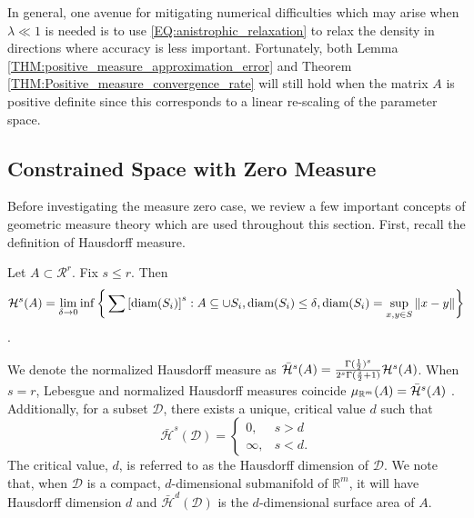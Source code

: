 \documentclass[10pt,fleqn]{article} \pdfoutput=1
\DeclareMathOperator{\1}{\mathbbm{1}} \DeclareMathOperator{\bigO}{\mc O}
\begin{document}
In general, one avenue for mitigating numerical difficulties which may
arise when $\lambda \ll 1$ is needed is to use 
\eqref{EQ:anistrophic_relaxation} to relax the density in directions where
accuracy is less important.  Fortunately, both Lemma
\ref{THM:positive_measure_approximation_error} and Theorem
\ref{THM:Positive_measure_convergence_rate} will still hold when the matrix $A$ is
positive definite since this corresponds to a  linear re-scaling of the
parameter space.


\subsection{Constrained Space with Zero Measure}
\label{SEC:Zero_measure_theory}

Before investigating the measure zero case, we review a few important concepts of
geometric measure theory which are used throughout this section.  First,
recall the definition of Hausdorff measure.  \begin{Hausdorff_def} Let
	$A\subset\mathcal{R}^r$. Fix $s \le r$. Then $$\mathcal{H}^{s}(A)=
		\underset{\delta\rightarrow 0}\lim \inf \bigg\{ \sum
		\left[{\text{diam}(S_i)}\right]^s: {A\subseteq \cup S_i,
		\text{diam}(S_i)\le \delta}, \text{diam}(S_i)=\sup_{x,y\in
			S}\|x-y\|\bigg\}$$.  \end{Hausdorff_def} We denote the normalized Hausdorff
measure as $\bar{\mathcal{H}}^{s}(A) =\frac{\Gamma(\frac{1}{2})^{s}}{2^s
		\Gamma(\frac{s}{2}+1)} \mathcal{H}^{s}(A)$. When $s=r$, Lebesgue and normalized
Hausdorff measures coincide  $\mu_{\mathbb{R}^m}(A)= \bar{\mathcal{H}}^{s}(A)$
\citep{evans2015measure}.  Additionally, for a subset $\mathcal{D}$, there
exists a unique, critical value $d$ such that
$$\bar{\mathcal{H}}^s(\mathcal{D}) = \begin{cases} 0, & s > d \\ \infty, &
		s < d.\end{cases}$$ The critical value, $d$, is referred to as the
Hausdorff dimension of $\mathcal{D}$. We note that, when $\mathcal{D}$ is a
compact, $d$-dimensional submanifold of $\mathbb{R}^m$, it will have
Hausdorff dimension $d$ and $\bar{\mathcal{H}}^d(\mathcal{D})$ is the
$d$-dimensional surface area of $A.$
\end{document}
